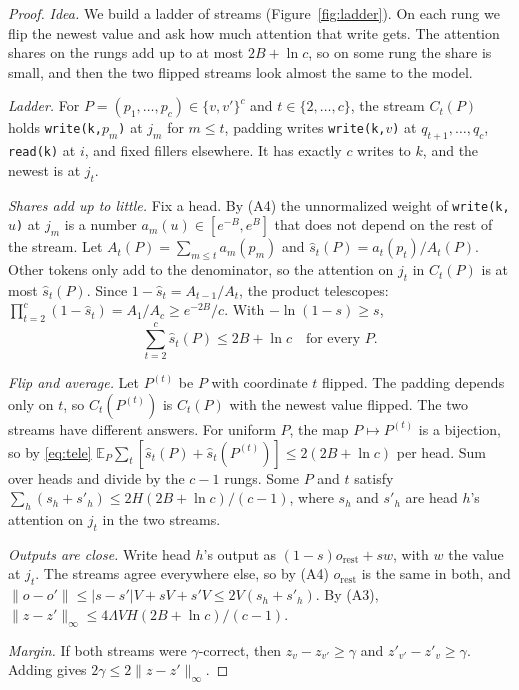 \documentclass[10pt]{article}
\theoremstyle{definition}
\theoremstyle{remark}
\newcommand{\shat}{\hat{s}}
\begin{document}
\begin{proof}
\emph{Idea.} We build a ladder of streams (Figure~\ref{fig:ladder}). On each rung we flip the newest value and ask how much attention that write gets. The attention shares on the rungs add up to at most $2B + \ln c$, so on some rung the share is small, and then the two flipped streams look almost the same to the model.

\emph{Ladder.} For $P = (p_1, \dots, p_c) \in \{v, v'\}^c$ and $t \in \{2, \dots, c\}$, the stream $C_t(P)$ holds \texttt{write(k,$p_m$)} at $j_m$ for $m \le t$, padding writes \texttt{write(k,$v$)} at $q_{t+1}, \dots, q_c$, \texttt{read(k)} at $i$, and fixed fillers elsewhere. It has exactly $c$ writes to $k$, and the newest is at $j_t$.

\emph{Shares add up to little.} Fix a head. By (A4) the unnormalized weight of \texttt{write(k,$u$)} at $j_m$ is a number $a_m(u) \in [e^{-B}, e^{B}]$ that does not depend on the rest of the stream. Let $A_t(P) = \sum_{m \le t} a_m(p_m)$ and $\shat_t(P) = a_t(p_t)/A_t(P)$. Other tokens only add to the denominator, so the attention on $j_t$ in $C_t(P)$ is at most $\shat_t(P)$. Since $1 - \shat_t = A_{t-1}/A_t$, the product telescopes: $\prod_{t=2}^{c} (1 - \shat_t) = A_1/A_c \ge e^{-2B}/c$. With $-\ln(1-s) \ge s$,
\begin{equation}\label{eq:tele}
\textstyle\sum_{t=2}^{c} \shat_t(P) \le 2B + \ln c \quad \text{for every } P.
\end{equation}

\emph{Flip and average.} Let $P^{(t)}$ be $P$ with coordinate $t$ flipped. The padding depends only on $t$, so $C_t(P^{(t)})$ is $C_t(P)$ with the newest value flipped. The two streams have different answers. For uniform $P$, the map $P \mapsto P^{(t)}$ is a bijection, so by \eqref{eq:tele} $\mathbb{E}_P \sum_t [\shat_t(P) + \shat_t(P^{(t)})] \le 2(2B + \ln c)$ per head. Sum over heads and divide by the $c - 1$ rungs. Some $P$ and $t$ satisfy $\sum_h (s_h + s'_h) \le 2H(2B + \ln c)/(c-1)$, where $s_h$ and $s'_h$ are head $h$'s attention on $j_t$ in the two streams.

\emph{Outputs are close.} Write head $h$'s output as $(1 - s) o_{\mathrm{rest}} + s w$, with $w$ the value at $j_t$. The streams agree everywhere else, so by (A4) $o_{\mathrm{rest}}$ is the same in both, and $\|o - o'\| \le |s - s'| V + sV + s'V \le 2V(s_h + s'_h)$. By (A3), $\|z - z'\|_\infty \le 4 \Lambda V H (2B + \ln c)/(c-1)$.

\emph{Margin.} If both streams were $\gamma$-correct, then $z_v - z_{v'} \ge \gamma$ and $z'_{v'} - z'_v \ge \gamma$. Adding gives $2\gamma \le 2\|z - z'\|_\infty$.
\end{proof}
\end{document}
